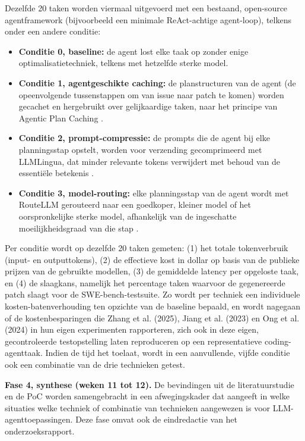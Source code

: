 \documentclass{hogent-article}
\begin{document}
Dezelfde 20 taken worden viermaal uitgevoerd met een bestaand, open-source agentframework (bijvoorbeeld een minimale ReAct-achtige agent-loop), telkens onder een andere conditie:
\begin{itemize}
  \item \textbf{Conditie 0, baseline:} de agent lost elke taak op zonder enige optimalisatietechniek, telkens met hetzelfde sterke model.
  \item \textbf{Conditie 1, agentgeschikte caching:} de planstructuren van de agent (de opeenvolgende tussenstappen om van issue naar patch te komen) worden gecachet en hergebruikt over gelijkaardige taken, naar het principe van Agentic Plan Caching \autocite{Zhang2025}.
  \item \textbf{Conditie 2, prompt-compressie:} de prompts die de agent bij elke planningsstap opstelt, worden voor verzending gecomprimeerd met LLMLingua, dat minder relevante tokens verwijdert met behoud van de essentiële betekenis \autocite{Jiang2023}.
  \item \textbf{Conditie 3, model-routing:} elke planningsstap van de agent wordt met RouteLLM gerouteerd naar een goedkoper, kleiner model of het oorspronkelijke sterke model, afhankelijk van de ingeschatte moeilijkheidsgraad van die stap \autocite{Ong2024}.
\end{itemize}

Per conditie wordt op dezelfde 20 taken gemeten: (1) het totale tokenverbruik (input- en outputtokens), (2) de effectieve kost in dollar op basis van de publieke prijzen van de gebruikte modellen, (3) de gemiddelde latency per opgeloste taak, en (4) de slaagkans, namelijk het percentage taken waarvoor de gegenereerde patch slaagt voor de SWE-bench-testsuite. Zo wordt per techniek een individuele kosten-batenverhouding ten opzichte van de baseline bepaald, en wordt nagegaan of de kostenbesparingen die Zhang et al. (2025), Jiang et al. (2023) en Ong et al. (2024) in hun eigen experimenten rapporteren, zich ook in deze eigen, gecontroleerde testopstelling laten reproduceren op een representatieve coding-agenttaak. Indien de tijd het toelaat, wordt in een aanvullende, vijfde conditie ook een combinatie van de drie technieken getest.

\textbf{Fase 4, synthese (weken 11 tot 12).} De bevindingen uit de literatuurstudie en de PoC worden samengebracht in een afwegingskader dat aangeeft in welke situaties welke techniek of combinatie van technieken aangewezen is voor LLM-agenttoepassingen. Deze fase omvat ook de eindredactie van het onderzoeksrapport.
\end{document}
